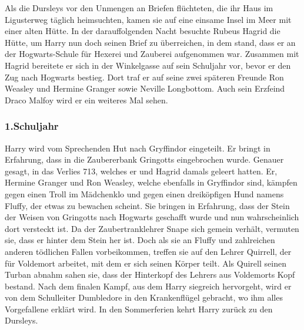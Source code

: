 \documentclass[a4paper, 10pt]{article}
\begin{document}
\vspace{10pt}
\newline
Als die Dursleys vor den Unmengen an Briefen flüchteten, die ihr Haus im Ligusterweg täglich heimsuchten, kamen sie auf eine einsame Insel im Meer mit einer alten Hütte. In der darauffolgenden Nacht besuchte Rubeus Hagrid die Hütte, um Harry nun doch seinen Brief zu überreichen, in dem stand, dass er an der Hogwarts-Schule für Hexerei und Zauberei aufgenommen war.
\vspace{10pt}
\newline
Zusammen mit Hagrid bereitete er sich in der Winkelgasse auf sein Schuljahr vor, bevor er den Zug nach Hogwarts bestieg. Dort traf er auf seine zwei späteren Freunde Ron Weasley und Hermine Granger sowie Neville Longbottom. Auch sein Erzfeind Draco Malfoy wird er ein weiteres Mal sehen.
\subsubsection*{\large 1.Schuljahr}
Harry wird vom Sprechenden Hut nach Gryffindor eingeteilt. Er bringt in Erfahrung, dass in die Zaubererbank Gringotts eingebrochen wurde. Genauer gesagt, in das Verlies 713, welches er und Hagrid damals geleert hatten.
\vspace{10pt}
\newline
Er, Hermine Granger und Ron Weasley, welche ebenfalls in Gryffindor sind, kämpfen gegen einen Troll im Mädchenklo und gegen einen dreiköpfigen Hund namens Fluffy, der etwas zu bewachen scheint. Sie bringen in Erfahrung, dass der Stein der Weisen von Gringotts nach Hogwarts geschafft wurde und nun wahrscheinlich dort versteckt ist.
\vspace{10pt}
\newline
Da der Zaubertranklehrer Snape sich gemein verhält, vermuten sie, dass er hinter dem Stein her ist. Doch als sie an Fluffy und zahlreichen anderen tödlichen Fallen vorbeikommen, treffen sie auf den Lehrer Quirrell, der für Voldemort arbeitet, mit dem er sich seinen Körper teilt. Als Quirell seinen Turban abnahm sahen sie, dass der Hinterkopf des Lehrers aus Voldemorts Kopf bestand.
\vspace{10pt}
\newline
Nach dem finalen Kampf, aus dem Harry siegreich hervorgeht, wird er von dem Schulleiter Dumbledore in den Krankenflügel gebracht, wo ihm alles Vorgefallene erklärt wird. In den Sommerferien kehrt Harry zurück zu den Dursleys.
\end{document}

